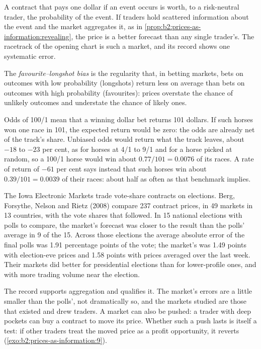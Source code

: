 A contract that pays one dollar if an event occurs is worth, to a risk-neutral trader, the probability of
the event. If traders hold scattered information about the event and the market aggregates it, as in
\cref{prop:b2:prices-as-information:revealing}, the price is a better forecast than any single trader's.
The racetrack of the opening chart is such a market, and its record shows one systematic error.

\begin{definition}\label{def:b2:prices-as-information:longshot-bias}
The \emph{favourite--longshot bias} is the regularity that, in betting
markets, bets on outcomes with low probability (longshots) return less on average than bets on outcomes
with high probability (favourites): prices overstate the chance of unlikely outcomes and understate the
chance of likely ones.
\end{definition}

Odds of 100/1 mean that a winning dollar bet returns 101 dollars. If such horses won one race in 101, the
expected return would be zero: the odds are already net of the track's share. Unbiased odds would return
what the track leaves, about $-18$ to $-23$ per cent, as for horses at 4/1 to 9/1 and for a horse picked at
random, so a 100/1 horse would win about $0.77/101 = 0.0076$ of its races. A rate of return of $-61$ per cent
says instead that such horses win about $0.39/101 = 0.0039$ of their races: about half as often as that
benchmark implies.

\begin{record}
The Iowa Electronic Markets trade vote-share contracts on elections. Berg, Forsythe,
Nelson and Rietz (2008) compare 237 contract prices, in 49 markets in 13 countries, with the vote shares
that followed. In 15 national elections with polls to compare, the market's forecast was closer to the
result than the polls' average in 9 of the 15. Across those elections the average absolute error of the
final polls was 1.91 percentage points of the vote; the market's was 1.49 points with election-eve prices
and 1.58 points with prices averaged over the last week. Their markets did better for presidential
elections than for lower-profile ones, and with more trading volume near the election.
\end{record}

The record supports aggregation and qualifies it. The market's errors are a little smaller than the
polls', not dramatically so, and the markets studied are those that existed and drew traders. A market
can also be pushed: a trader with deep pockets can buy a contract to move its price. Whether such a push
lasts is itself a test: if other traders treat the moved price as a profit opportunity, it reverts
(\cref{exo:b2:prices-as-information:9}).

